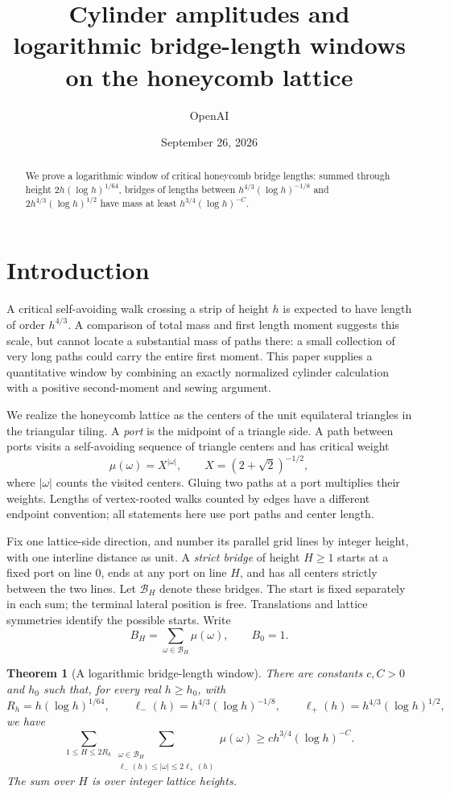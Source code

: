 \documentclass[11pt]{article}
\title{Cylinder amplitudes and logarithmic bridge-length windows on the honeycomb lattice}
\author{OpenAI}\date{September 26, 2026}
\numberwithin{equation}{section}
\newtheorem{theorem}{Theorem}[section]
\theoremstyle{definition}\newtheorem{definition}[theorem]{Definition}
\theoremstyle{remark}\newtheorem{remark}[theorem]{Remark}
\begin{document}
\maketitle
\begin{abstract}
We prove a logarithmic window of critical honeycomb bridge lengths: summed through height $2h(\log h)^{1/64}$, bridges of lengths between $h^{4/3}(\log h)^{-1/8}$ and $2h^{4/3}(\log h)^{1/2}$ have mass at least $h^{3/4}(\log h)^{-C}$.
\end{abstract}
\section{Introduction}
A critical self-avoiding walk crossing a strip of height $h$ is expected
to have length of order $h^{4/3}$. A comparison of total mass and first
length moment suggests this scale, but cannot locate a substantial mass
of paths there: a small collection of very long paths could carry the
entire first moment. This paper supplies a quantitative window by combining
an exactly normalized cylinder calculation with a positive second-moment
and sewing argument.

We realize the honeycomb lattice as the centers of the unit equilateral
triangles in the triangular tiling. A \emph{port} is the midpoint of a
triangle side. A path between ports visits a self-avoiding sequence of
triangle centers and has critical weight
\[
 \mu(\omega)=X^{|\omega|},\qquad X=(2+\sqrt2)^{-1/2},
\]
where $|\omega|$ counts the visited centers. Gluing two paths at a port
multiplies their weights. Lengths of vertex-rooted walks counted by edges
have a different endpoint convention; all statements here use port paths
and center length.

Fix one lattice-side direction, and number its parallel grid lines by
integer height, with one interline distance as unit. A \emph{strict bridge}
of height $H\ge1$ starts at a fixed port on line $0$, ends at any port on
line $H$, and has all centers strictly between the two lines. Let
$\mathcal B_H$ denote these bridges. The start is fixed separately in
each sum; the terminal lateral position is free. Translations and lattice
symmetries identify the possible starts. Write
\[
 B_H=\sum_{\omega\in\mathcal B_H}\mu(\omega),\qquad B_0=1.
\]

\begin{theorem}[A logarithmic bridge-length window]\label{L:thm:window}
There are constants $c,C>0$ and $h_0$ such that, for every real
$h\ge h_0$, with
\[
 R_h=h(\log h)^{1/64},\qquad
 \ell_-(h)=h^{4/3}(\log h)^{-1/8},\qquad
 \ell_+(h)=h^{4/3}(\log h)^{1/2},
\]
we have
\[
 \sum_{1\le H\le 2R_h}
 \sum_{\substack{\omega\in\mathcal B_H\\
       \ell_-(h)\le|\omega|\le2\ell_+(h)}}\mu(\omega)
 \ge c h^{3/4}(\log h)^{-C}.
\]
The sum over $H$ is over integer lattice heights.
\end{theorem}
\end{document}
